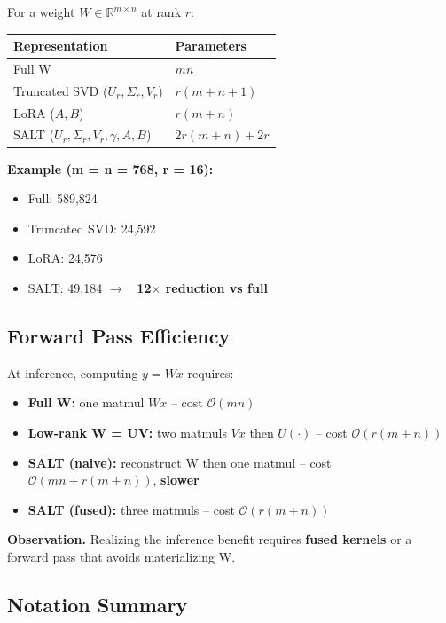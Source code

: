 For a weight $W \in \mathbb{R}^{m \times n}$ at rank $r$:

\begin{table}[H]
\centering
\small
\begin{tabular}{ll}
\toprule
\textbf{Representation} & \textbf{Parameters} \\
\midrule
Full W & $mn$ \\
Truncated SVD ($U_r, \Sigma_r, V_r$) & $r(m + n + 1)$ \\
LoRA ($A, B$) & $r(m + n)$ \\
SALT ($U_r, \Sigma_r, V_r, \gamma, A, B$) & $2r(m + n) + 2r$ \\
\bottomrule
\end{tabular}
\end{table}

\textbf{Example (m = n = 768, r = 16):}

\begin{itemize}
\item Full: 589,824
\item Truncated SVD: 24,592
\item LoRA: 24,576
\item SALT: 49,184 $\to$ \textbf{~12$\times$ reduction vs full}

\end{itemize}
\subsection{Forward Pass Efficiency}

At inference, computing $y = Wx$ requires:

\begin{itemize}
\item \textbf{Full W:} one matmul $Wx$ -- cost $\mathcal{O}(mn)$
\item \textbf{Low-rank W = UV:} two matmuls $Vx$ then $U(\cdot)$ -- cost $\mathcal{O}(r(m+n))$
\item \textbf{SALT (naive):} reconstruct W then one matmul -- cost $\mathcal{O}(mn + r(m+n))$, \textbf{slower}
\item \textbf{SALT (fused):} three matmuls -- cost $\mathcal{O}(r(m+n))$

\end{itemize}
\textbf{Observation.} Realizing the inference benefit requires \textbf{fused kernels} 
or a forward pass that avoids materializing W.

\subsection{Notation Summary}

